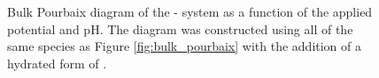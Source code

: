 \begin{figure}[!htb]
\centering
{}
\caption{\label{fig:bulk_pourbaix_w_irho3}
%
Bulk Pourbaix diagram of the - system as a function of the applied potential and pH.
%
The diagram was constructed using all of the same species as Figure \ref{fig:bulk_pourbaix} with the addition of a hydrated form of \aIrOthree.
}
\end{figure}




